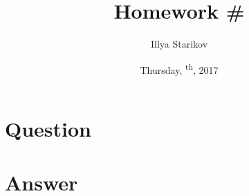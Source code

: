 \documentclass[12pt]{article}
\title{Homework \#}
\date{Thursday, \textsuperscript{th}, 2017}
\author{Illya Starikov}
\begin{document}
\maketitle

\section*{Question}

\section*{Answer}
\end{document}
